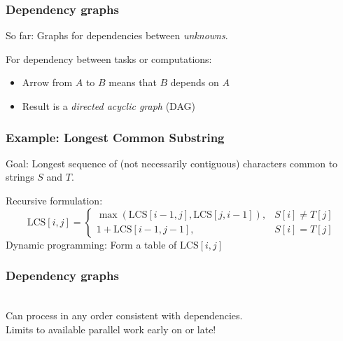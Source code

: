\documentclass{beamer}
\begin{document}
\begin{frame}
  \frametitle{Dependency graphs}

  So far: Graphs for dependencies between {\em unknowns}.
  
  \vspace{5mm}
  For dependency between tasks or computations:
  \begin{itemize}
  \item Arrow from $A$ to $B$ means that $B$ depends on $A$
  \item Result is a {\em directed acyclic graph} (DAG)
  \end{itemize}
\end{frame}


\begin{frame}
  \frametitle{Example: Longest Common Substring}

  Goal: Longest sequence of (not necessarily contiguous) characters
  common to strings $S$ and $T$.

  Recursive formulation:
  \[
  \mathrm{LCS}[i,j] =
  \begin{cases}
    \max(\mathrm{LCS}[i-1,j], \mathrm{LCS}[j,i-1]), & S[i] \neq T[j] \\
    1 + \mathrm{LCS}[i-1,j-1], & S[i] = T[j]
  \end{cases}
  \]
  Dynamic programming: Form a table of $\mathrm{LCS}[i,j]$
\end{frame}


\begin{frame}
  \frametitle{Dependency graphs}

  \begin{center}
   \\
  Can process in any order consistent with dependencies. \\
  Limits to available parallel work early on or late!
  \end{center}
\end{frame}
\end{document}

